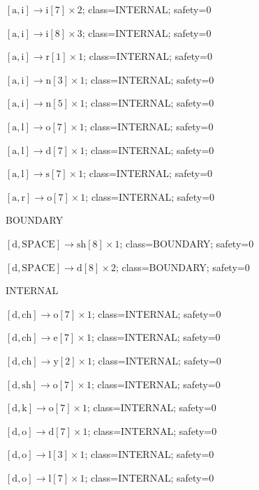 \(\left[\mathrm{a}, \mathrm{i}\right] \to \mathrm{i}[7] \times 2\); class=INTERNAL; safety=0\par
\(\left[\mathrm{a}, \mathrm{i}\right] \to \mathrm{i}[8] \times 3\); class=INTERNAL; safety=0\par
\(\left[\mathrm{a}, \mathrm{i}\right] \to \mathrm{r}[1] \times 1\); class=INTERNAL; safety=0\par
\(\left[\mathrm{a}, \mathrm{i}\right] \to \mathrm{n}[3] \times 1\); class=INTERNAL; safety=0\par
\(\left[\mathrm{a}, \mathrm{i}\right] \to \mathrm{n}[5] \times 1\); class=INTERNAL; safety=0\par
\(\left[\mathrm{a}, \mathrm{l}\right] \to \mathrm{o}[7] \times 1\); class=INTERNAL; safety=0\par
\(\left[\mathrm{a}, \mathrm{l}\right] \to \mathrm{d}[7] \times 1\); class=INTERNAL; safety=0\par
\(\left[\mathrm{a}, \mathrm{l}\right] \to \mathrm{s}[7] \times 1\); class=INTERNAL; safety=0\par
\(\left[\mathrm{a}, \mathrm{r}\right] \to \mathrm{o}[7] \times 1\); class=INTERNAL; safety=0\par
BOUNDARY\par
\(\left[\mathrm{d}, \mathrm{SPACE}\right] \to \mathrm{sh}[8] \times 1\); class=BOUNDARY; safety=0\par
\(\left[\mathrm{d}, \mathrm{SPACE}\right] \to \mathrm{d}[8] \times 2\); class=BOUNDARY; safety=0\par
INTERNAL\par
\(\left[\mathrm{d}, \mathrm{ch}\right] \to \mathrm{o}[7] \times 1\); class=INTERNAL; safety=0\par
\(\left[\mathrm{d}, \mathrm{ch}\right] \to \mathrm{e}[7] \times 1\); class=INTERNAL; safety=0\par
\(\left[\mathrm{d}, \mathrm{ch}\right] \to \mathrm{y}[2] \times 1\); class=INTERNAL; safety=0\par
\(\left[\mathrm{d}, \mathrm{sh}\right] \to \mathrm{o}[7] \times 1\); class=INTERNAL; safety=0\par
\(\left[\mathrm{d}, \mathrm{k}\right] \to \mathrm{o}[7] \times 1\); class=INTERNAL; safety=0\par
\(\left[\mathrm{d}, \mathrm{o}\right] \to \mathrm{d}[7] \times 1\); class=INTERNAL; safety=0\par
\(\left[\mathrm{d}, \mathrm{o}\right] \to \mathrm{l}[3] \times 1\); class=INTERNAL; safety=0\par
\(\left[\mathrm{d}, \mathrm{o}\right] \to \mathrm{l}[7] \times 1\); class=INTERNAL; safety=0\par
